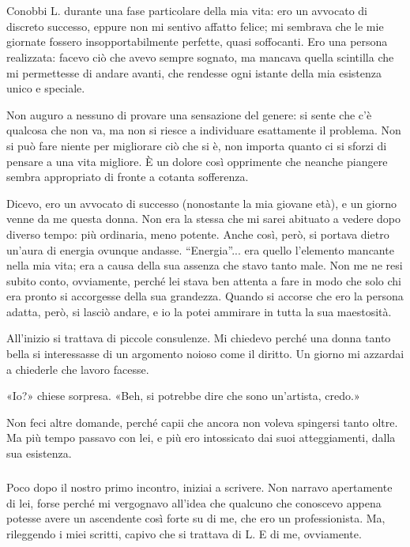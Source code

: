 \documentclass[a4paper,12pt]{book}
\begin{document}
\chapter{}


\paragraph{}
Conobbi L. durante una fase particolare della mia vita: ero un avvocato di
discreto successo, eppure non mi sentivo affatto felice; mi sembrava che le mie
giornate fossero insopportabilmente perfette, quasi soffocanti. Ero una persona
realizzata: facevo ciò che avevo sempre sognato, ma mancava quella scintilla
che mi permettesse di andare avanti, che rendesse ogni istante della mia
esistenza unico e speciale.

Non auguro a nessuno di provare una sensazione del genere: si sente che c’è
qualcosa che non va, ma non si riesce a individuare esattamente il problema. Non
si può fare niente per migliorare ciò che si è, non importa quanto ci si
sforzi di pensare a una vita migliore. È un dolore così opprimente che neanche
piangere sembra appropriato di fronte a cotanta sofferenza.

Dicevo, ero un avvocato di successo (nonostante la mia giovane età), e un
giorno venne da me questa donna. Non era la stessa che mi sarei abituato a
vedere dopo diverso tempo: più ordinaria, meno potente. Anche così, però, si
portava dietro un’aura di energia ovunque andasse. ``Energia''... era quello
l’elemento mancante nella mia vita; era a causa della sua assenza che stavo
tanto male. Non me ne resi subito conto, ovviamente, perché lei stava ben
attenta a fare in modo che solo chi era pronto si accorgesse della sua
grandezza. Quando si accorse che ero la persona adatta, però, si lasciò
andare, e io la potei ammirare in tutta la sua maestosità.

All’inizio si trattava di piccole consulenze. Mi chiedevo perché una donna
tanto bella si interessasse di un argomento noioso come il diritto. Un giorno mi
azzardai a chiederle che lavoro facesse.

«Io?» chiese sorpresa. «Beh, si potrebbe dire che sono un’artista, credo.»

Non feci altre domande, perché capii che ancora non voleva spingersi tanto
oltre. Ma più tempo passavo con lei, e più ero intossicato dai suoi
atteggiamenti, dalla sua esistenza.

\paragraph{}
Poco dopo il nostro primo incontro, iniziai a scrivere. Non narravo apertamente
di lei, forse perché mi vergognavo all’idea che qualcuno che conoscevo appena
potesse avere un ascendente così forte su di me, che ero un professionista. Ma,
rileggendo i miei scritti, capivo che si trattava di L. E di me, ovviamente.
\end{document}
